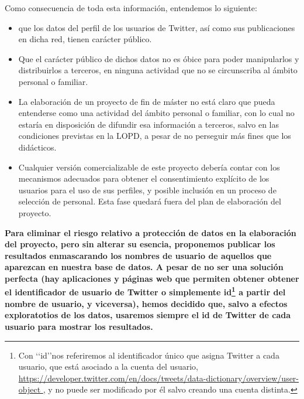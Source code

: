 Como consecuencia de toda esta información, entendemos lo siguiente:
\begin{itemize}
\item que los datos del perfil de los usuarios de Twitter, así como sus publicaciones en dicha red,
tienen carácter público.
\item Que el carácter público de dichos datos no es óbice para poder manipularlos y distribuirlos
a terceros, en ninguna actividad que no se circunscriba al ámbito personal o familiar.
\item La elaboración de un proyecto de fin de máster no está claro
que pueda entenderse como una actividad del ámbito personal o familiar, con lo cual no estaría en disposición de difundir esa información a terceros, salvo en las condiciones previstas en la LOPD,
a pesar de no perseguir más fines que los didácticos.
\item Cualquier versión comercializable de este proyecto debería contar con los mecanismos
adecuados para obtener el consentimiento explícito de los usuarios para el uso de sus perfiles, 
y posible inclusión en un proceso de selección de personal. Esta fase quedará fuera del plan de elaboración
del proyecto.
\end{itemize}
{\bf\color{oblue}
\label{note:why_only_user_id}
Para eliminar el riesgo relativo a protección de datos en la elaboración del proyecto, 
pero sin alterar su esencia, proponemos publicar los resultados enmascarando los nombres 
de usuario de aquellos que aparezcan en nuestra base de datos. A pesar de no ser una solución
perfecta (hay aplicaciones y páginas web que permiten obtener obtener el identificador de usuario
de Twitter o simplemente id\footnote{Con \lq\lq id\rq\rq nos referiremos al identificador único 
que asigna Twitter a cada usuario, que está asociado a la cuenta del usuario, \url{https://developer.twitter.com/en/docs/tweets/data-dictionary/overview/user-object },
y no puede ser modificado por él salvo creando una cuenta distinta.}
a partir del nombre de usuario, y viceversa), hemos decidido que, salvo 
a efectos exploratotios de los datos, usaremos siempre el id de Twitter de
cada usuario para mostrar los resultados. }

